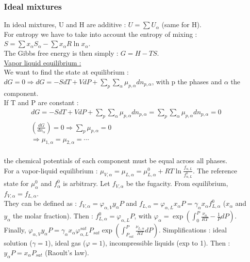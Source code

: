 \documentclass[../main.tex]{subfiles}
\begin{document}
\subsubsection{Ideal mixtures}
In ideal mixtures, U and H are additive : $U = \sum U_\alpha$ (same for H).\\
For entropy we have to take into account the entropy of mixing : $S = \sum x_\alpha S_\alpha - \sum x_\alpha R \ln x_\alpha$.\\
The Gibbs free energy is then simply : $G = H-TS$.\\

\quad \underline{Vapor liquid equilibrium :}\\
We want to find the state at equilibrium : $dG=0 \Rightarrow dG = -SdT + VdP + \sum_p \sum_\alpha \mu_{p,\alpha} dn_{p,\alpha}$, with p the phases and $\alpha$ the component.\\

If T and P are constant : \begin{equation}
    \begin{gathered}
        dG = -SdT+ VdP + \sum_p \sum_\alpha \mu_{p,\alpha} dn_{p,\alpha} = \sum_p \sum_\alpha \mu_{p,\alpha} dn_{p,\alpha} = 0\\
        (\frac{dG}{dn_\alpha}) = 0 \Rightarrow \sum_p \mu_{p,\alpha} = 0\\
        \Rightarrow \mu_{1,\alpha} = \mu_{2,\alpha} = \cdots\\
    \end{gathered}
\end{equation}

\warning the chemical potentials of each component must be equal across all phases.\\
For a vapor-liquid equilibrium : $\mu_{V,\alpha} = \mu_{L,\alpha} = \mu_{L,\alpha}^0 + RT \ln \frac{f_{\alpha,L}}{f_{\alpha,L}^0}$. The reference state for $\mu_\alpha^0$ and $f_\alpha^0$ is arbitrary. Let $f_{V,\alpha}$ be the fugacity. From equilibrium, $f_{V,\alpha} = f_{L,\alpha}$.\\
They can be defined as : $f_{V,\alpha} = \varphi_{\alpha,V} y_\alpha P$ and $f_{L,\alpha} = \varphi_{\alpha,L} x_\alpha P = \gamma_\alpha x_\alpha f_{L,\alpha}^0$ ($x_\alpha$ and $y_\alpha$ the molar fraction). Then : $f_{L,\alpha}^0 = \varphi_{\alpha,L}P$, with $\varphi_\alpha = \exp(\int_0^P \frac{\nu_\alpha}{RT}-\frac{1}{P}dP)$. Finally, $\varphi_{\alpha,V}y_\alpha P = \gamma_\alpha x_\alpha \varphi_{\alpha,L}^{sat} P_{sat} \exp(\int_{P_{sat}}^P \frac{\nu_{L,\alpha}}{RT}dP)$. Simplifications : ideal solution ($\gamma=1$), ideal gas ($\varphi=1$), incompressible liquids (exp to 1). Then : $y_\alpha P = x_\alpha P_{sat}$ (Raoult's law).\\
\end{document}
